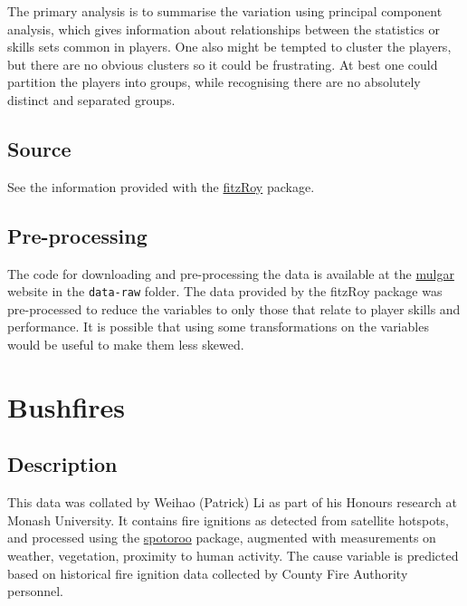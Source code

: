 \documentclass[
  letterpaper,
]{krantz}
\begin{document}
The primary analysis is to summarise the variation using principal
component analysis, which gives information about relationships between
the statistics or skills sets common in players. One also might be
tempted to cluster the players, but there are no obvious clusters so it
could be frustrating. At best one could partition the players into
groups, while recognising there are no absolutely distinct and separated
groups.

\subsection*{Source}\label{source}

See the information provided with the
\href{https://jimmyday12.github.io/fitzRoy/}{fitzRoy} package.

\subsection*{Pre-processing}\label{pre-processing}

The code for downloading and pre-processing the data is available at the
\href{https://dicook.github.io/mulgar/}{mulgar} website in the
\texttt{data-raw} folder. The data provided by the fitzRoy package was
pre-processed to reduce the variables to only those that relate to
player skills and performance. It is possible that using some
transformations on the variables would be useful to make them less
skewed.

\section{Bushfires}\label{bushfires}

\subsection*{Description}\label{description-1}

This data was collated by Weihao (Patrick) Li as part of his Honours
research at Monash University. It contains fire ignitions as detected
from satellite hotspots, and processed using the
\href{https://tengmcing.github.io/spotoroo/}{spotoroo} package,
augmented with measurements on weather, vegetation, proximity to human
activity. The cause variable is predicted based on historical fire
ignition data collected by County Fire Authority personnel.
\end{document}
